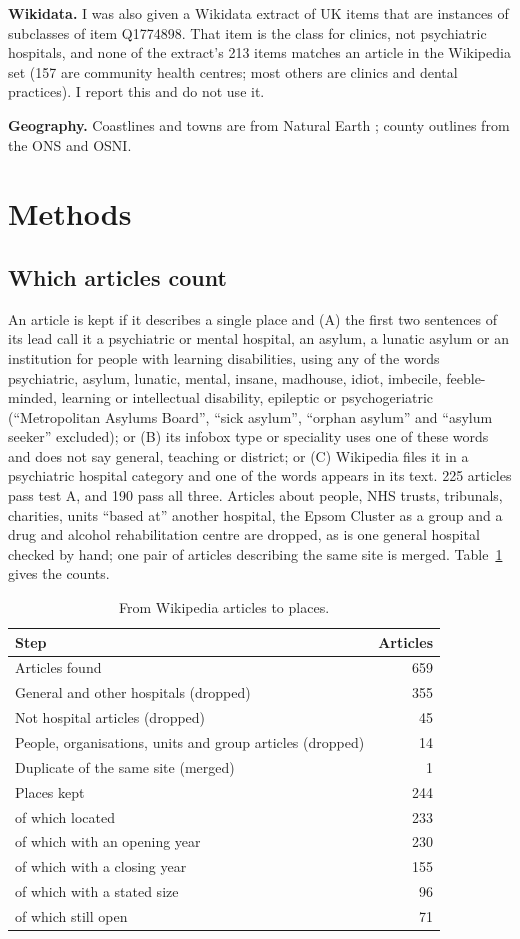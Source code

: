\documentclass[11pt,a4paper]{article}
\begin{document}
\textbf{Wikidata.} I was also given a Wikidata extract of UK items that are instances of subclasses of item Q1774898. That item is the class for clinics, not psychiatric hospitals, and none of the extract's 213 items matches an article in the Wikipedia set (157 are community health centres; most others are clinics and dental practices). I report this and do not use it.

\textbf{Geography.} Coastlines and towns are from Natural Earth \citep{naturalearth}; county outlines from the ONS and OSNI.

\section{Methods}
\subsection{Which articles count}
An article is kept if it describes a single place and (A) the first two sentences of its lead call it a psychiatric or mental hospital, an asylum, a lunatic asylum or an institution for people with learning disabilities, using any of the words psychiatric, asylum, lunatic, mental, insane, madhouse, idiot, imbecile, feeble-minded, learning or intellectual disability, epileptic or psychogeriatric (``Metropolitan Asylums Board'', ``sick asylum'', ``orphan asylum'' and ``asylum seeker'' excluded); or (B) its infobox type or speciality uses one of these words and does not say general, teaching or district; or (C) Wikipedia files it in a psychiatric hospital category and one of the words appears in its text. 225 articles pass test A, and 190 pass all three. Articles about people, NHS trusts, tribunals, charities, units ``based at'' another hospital, the Epsom Cluster as a group and a drug and alcohol rehabilitation centre are dropped, as is one general hospital checked by hand; one pair of articles describing the same site is merged. Table~\ref{tab:select} gives the counts.

\begin{table}[tbp]\centering\small\caption{From Wikipedia articles to places.}\label{tab:select}\begin{tabular}{lr}\toprule Step & Articles\\\midrule
Articles found & 659\\
General and other hospitals (dropped) & 355\\
Not hospital articles (dropped) & 45\\
People, organisations, units and group articles (dropped) & 14\\
Duplicate of the same site (merged) & 1\\
Places kept & 244\\
of which located & 233\\
of which with an opening year & 230\\
of which with a closing year & 155\\
of which with a stated size & 96\\
of which still open & 71\\
\bottomrule\end{tabular}\end{table}
\end{document}
